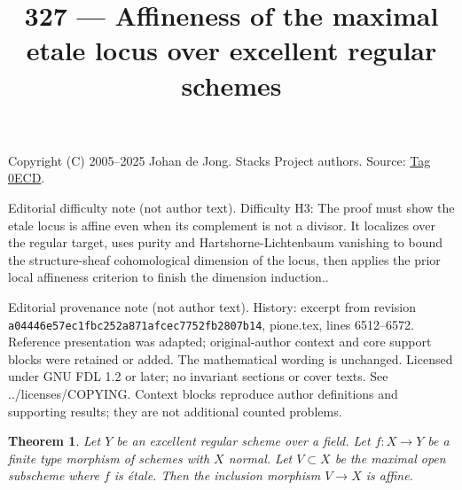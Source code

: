 \documentclass{amsart}
\theoremstyle{plain}
\newtheorem{theorem}[subsection]{Theorem}
\theoremstyle{definition}
\theoremstyle{remark}
\numberwithin{equation}{subsection}
\begin{document}
\title[Stacks Project, Tag 0ECD]{327 --- Affineness of the maximal etale locus over excellent regular schemes}
\maketitle
\noindent Copyright (C) 2005--2025 Johan de Jong. Stacks Project authors. Source: \href{https://stacks.math.columbia.edu/tag/0ECD}{Tag 0ECD}.

\noindent Editorial difficulty note (not author text). Difficulty H3: The proof must show the etale locus is affine even when its complement is not a divisor. It localizes over the regular target, uses purity and Hartshorne-Lichtenbaum vanishing to bound the structure-sheaf cohomological dimension of the locus, then applies the prior local affineness criterion to finish the dimension induction..

\noindent Editorial provenance note (not author text). History: excerpt from revision \texttt{a0444\allowbreak 6e57e\allowbreak c1fbc\allowbreak 252a8\allowbreak 71afc\allowbreak ec775\allowbreak 2fb28\allowbreak 07b14}, pione.tex, lines 6512--6572. Reference presentation was adapted; original-author context and core support blocks were retained or added. The mathematical wording is unchanged. Licensed under GNU FDL 1.2 or later; no invariant sections or cover texts. See ../licenses/COPYING. Context blocks reproduce author definitions and supporting results; they are not additional counted problems.

\begin{theorem}
\label{theorem-global}
Let $Y$ be an excellent regular scheme over a field. Let $f : X \to Y$
be a finite type morphism of schemes with $X$ normal. Let $V \subset X$
be the maximal open subscheme where $f$ is \'etale. Then the inclusion
morphism $V \to X$ is affine.
\end{theorem}
\end{document}
